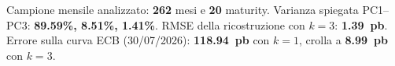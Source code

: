 Campione mensile analizzato: \textbf{262} mesi e \textbf{20} maturity.
Varianza spiegata PC1--PC3: \textbf{89.59\%, 8.51\%, 1.41\%}.
RMSE della ricostruzione con $k=3$: \textbf{1.39~pb}.
Errore sulla curva ECB (30/07/2026): \textbf{118.94~pb} con $k=1$, crolla a \textbf{8.99~pb} con $k=3$.
